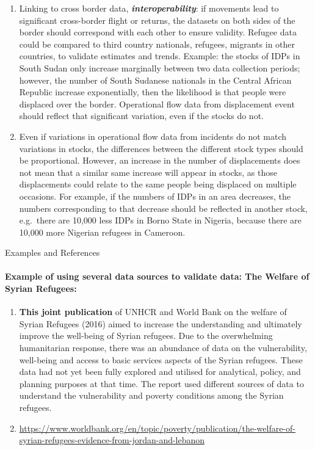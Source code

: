 \documentclass[
]{article}
\begin{document}
\begin{enumerate}
\item
  Linking to cross border data, \textbf{\emph{interoperability}}: if movements
  lead to significant cross-border flight or returns, the datasets on
  both sides of the border should correspond with each other to ensure
  validity. Refugee data could be compared to third country nationals,
  refugees, migrants in other countries, to validate estimates and
  trends. Example: the stocks of IDPs in South Sudan only increase
  marginally between two data collection periods; however, the number
  of South Sudanese nationals in the Central African Republic increase
  exponentially, then the likelihood is that people were displaced
  over the border. Operational flow data from displacement event
  should reflect that significant variation, even if the stocks do
  not.
\item
  Even if variations in operational flow data from incidents do not
  match variations in stocks, the differences between the different
  stock types should be proportional. However, an increase in the
  number of displacements does not mean that a similar same increase
  will appear in stocks, as those displacements could relate to the
  same people being displaced on multiple occasions. For example, if
  the numbers of IDPs in an area decreases, the numbers corresponding
  to that decrease should be reflected in another stock, e.g.~there
  are 10,000 less IDPs in Borno State in Nigeria, because there are
  10,000 more Nigerian refugees in Cameroon.
\end{enumerate}

Examples and References

\hypertarget{example-of-using-several-data-sources-to-validate-data-the-welfare-of-syrian-refugees-1}{%
\paragraph{Example of using several data sources to validate data: The Welfare of Syrian Refugees:}\label{example-of-using-several-data-sources-to-validate-data-the-welfare-of-syrian-refugees-1}}

\begin{enumerate}
\def\labelenumi{\arabic{enumi}.}
\setcounter{enumi}{470}
\item
  \textbf{This joint publication} of UNHCR and World Bank on the welfare
  of Syrian Refugees (2016) aimed to increase the understanding and
  ultimately improve the well-being of Syrian refugees. Due to the
  overwhelming humanitarian response, there was an abundance of data
  on the vulnerability, well-being and access to basic services
  aspects of the Syrian refugees. These data had not yet been fully
  explored and utilised for analytical, policy, and planning purposes
  at that time. The report used different sources of data to
  understand the vulnerability and poverty conditions among the Syrian
  refugees.
\item
  \url{https://www.worldbank.org/en/topic/poverty/publication/the-welfare-of-syrian-refugees-evidence-from-jordan-and-lebanon}
\end{enumerate}
\end{document}
